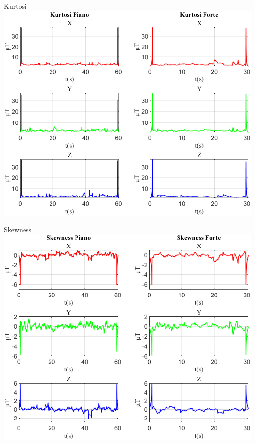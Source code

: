 	\begin{frame}{{Kurtosi}}
		\centering\includegraphics[height=.8\textheight]{figure/Mag/Kurtosi}
	\end{frame}
	
	\begin{frame}{{Skewness}}
		\centering\includegraphics[height=.8\textheight]{figure/Mag/Skewness}
	\end{frame}
	
